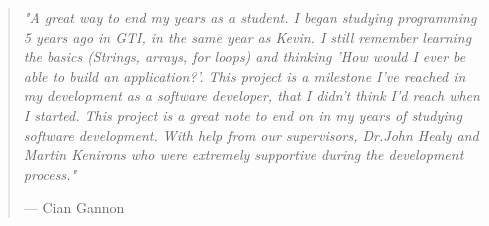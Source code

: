 \begin{quote}
\textit{"A great way to end my years as a student. I began studying programming 5 years ago in GTI, in the same year as Kevin. I still remember learning the basics (Strings, arrays, for loops) and thinking 'How would I ever be able to build an application?'. This project is a milestone I've reached in my development as a software developer, that I didn't think I'd reach when I started. This project is a great note to end on in my years of studying software development. With help from our supervisors, Dr.John Healy and Martin Kenirons who were extremely supportive during the development process."}\par\raggedleft--- \textup{Cian Gannon}
\end{quote}
